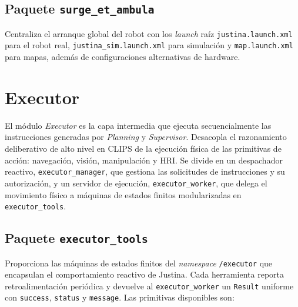 
\subsection{Paquete \texttt{surge\_et\_ambula}}
Centraliza el arranque global del robot con los \textit{launch} raíz \texttt{justina.launch.xml} para el robot real, \texttt{justina\_sim.launch.xml} para simulación y \texttt{map.launch.xml} para mapas, además de configuraciones alternativas de hardware.


\section[Executor]{Executor}
\label{sec:justina_executor}

El módulo \textit{Executor} es la capa intermedia que ejecuta secuencialmente las instrucciones generadas por \textit{Planning} y \textit{Supervisor}. Desacopla el razonamiento deliberativo de alto nivel en CLIPS de la ejecución física de las primitivas de acción: navegación, visión, manipulación y HRI. Se divide en un despachador reactivo, \texttt{executor\_manager}, que gestiona las solicitudes de instrucciones y su autorización, y un servidor de ejecución, \texttt{executor\_worker}, que delega el movimiento físico a máquinas de estados finitos modularizadas en \texttt{executor\_tools}.

\subsection{Paquete \texttt{executor\_tools}}
\label{subsec:executor_tools}

Proporciona las máquinas de estados finitos del \textit{namespace} \texttt{/executor} que encapsulan el comportamiento reactivo de Justina. Cada herramienta reporta retroalimentación periódica y devuelve al \texttt{executor\_worker} un \texttt{Result} uniforme con \texttt{success}, \texttt{status} y \texttt{message}. Las primitivas disponibles son:

